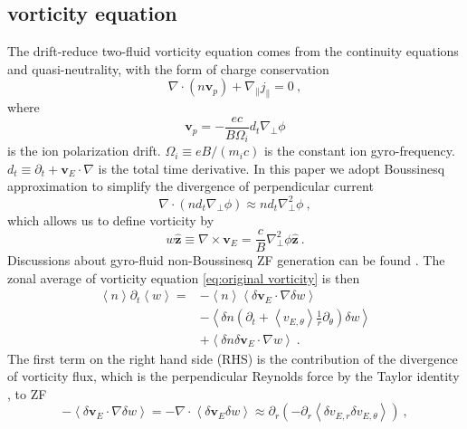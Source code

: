 \documentclass[aps,pre,twocolumn,superscriptaddress]{revtex4-2}
\begin{document}
\subsection{\label{subsec:vorticity equation}vorticity equation}
The drift-reduce two-fluid vorticity equation comes from the continuity equations and quasi-neutrality, with the form of charge conservation \cite{Zeiler_1997}
\begin{equation}
	\nabla\cdot\left(n\bm{v}_{p}\right)+\nabla_{\parallel}j_{\parallel}=0~,
\label{eq:original vorticity}
\end{equation}
where 
\begin{equation}
	\bm{v}_{p}=-\frac{ec}{B\Omega_{i}}d_t\nabla_{\perp}\phi
\end{equation}
is the ion polarization drift. $\Omega_{i}\equiv eB/\left(m_{i}c\right)$ is the constant ion gyro-frequency. $d_{t}\equiv\partial_{t}+\bm{v}_{E}\cdot\nabla$ is the total time derivative. In this paper we adopt Boussinesq approximation \cite{Ricci_2012} to simplify the divergence of perpendicular current
\begin{equation}
	\nabla\cdot\left(nd_{t}\nabla_{\perp}\phi\right)\approx nd_{t}\nabla_{\perp}^{2}\phi~,
\label{eq:Boussinesq}
\end{equation}
which allows us to define vorticity by
\begin{equation}
	w\hat{\bm{z}}\equiv\nabla\times\bm{v}_{E}
	=\frac{c}{B}\nabla_{\perp}^{2}\phi\hat{\bm{z}}~.
\end{equation}
Discussions about gyro-fluid non-Boussinesq ZF generation can be found \cite{Held_2018}. The zonal average of vorticity equation \cref{eq:original vorticity} is then
\begin{equation}
\begin{aligned}
	\left<n\right>\partial_{t}\left<w\right>=&-\left<n\right>\left<\delta\bm{v}_{E}\cdot\nabla\delta w\right> \\
	&-\left<\delta n\left(\partial_{t}+\left<v_{E,\theta}\right>\frac{1}{r}\partial_{\theta}\right)\delta w\right> \\
	&+\left<\delta n\delta\bm{v}_{E}\cdot\nabla w\right>~.
\end{aligned}
\end{equation}
The first term on the right hand side (RHS) is the contribution of the divergence of vorticity flux, which is the perpendicular Reynolds force by the Taylor identity \cite{Li_2018,Diamond_1991}, to ZF
\begin{equation}
	-\left<\delta\bm{v}_{E}\cdot\nabla\delta w\right>
	=-\nabla\cdot\left<\delta\bm{v}_E\delta w\right>
	\approx\partial_r\left(-\partial_{r}\left<\delta v_{E,r}\delta v_{E,\theta}\right>\right)~,
\end{equation}
\end{document}
